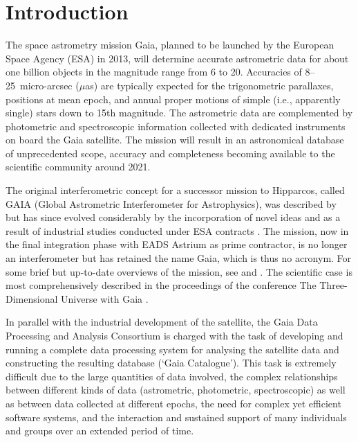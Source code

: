 \documentclass[structabstract]{aa}
\begin{document}
\section{Introduction}\label{sec:intro}

The space astrometry mission Gaia, planned to be launched by the
European Space Agency (ESA) in 2013, will determine accurate astrometric
data for about one billion objects in the magnitude range from 6 to 20.
Accuracies of 8--25~micro-arcsec ($\mu$as) are typically expected for the trigonometric
parallaxes, positions at mean epoch, and annual proper motions of
simple (i.e., apparently single) stars down to 15th magnitude. The
astrometric data are complemented by photometric and spectroscopic
information collected with dedicated instruments on board the Gaia
satellite. The mission will result in an astronomical database of
unprecedented scope, accuracy and completeness becoming available
to the scientific community around 2021.

The original interferometric concept for a successor mission to
Hipparcos, called GAIA (Global Astrometric Interferometer for
Astrophysics), was described by \citet{gaia1996} but has since evolved
considerably by the incorporation of novel ideas \citep{iaus248:EH} and as a 
result of industrial studies conducted under ESA contracts \citep{gaia2001}.
The mission, now in the final integration phase with
EADS Astrium as prime contractor, is no longer an interferometer but
has retained the name Gaia, which is thus no acronym. For some brief
but up-to-date overviews of the mission, see \citet{iaus248:LL}
and \citet{iaus261:LL}. The scientific case is most comprehensively described 
in the proceedings of the conference The Three-Dimensional Universe with 
Gaia \citep{2005ESASP.576.....T}.

In parallel with the industrial development of
the satellite, the Gaia Data Processing and Analysis Consortium
\citep[DPAC;][]{iaus248:FM} is charged with the task of developing and
running a complete data processing system for analysing the satellite
data and constructing the resulting database (`Gaia Catalogue').
This task is extremely difficult due to the large quantities of
data involved, the complex relationships between different kinds
of data (astrometric, photometric, spectroscopic) as well as between
data collected at different epochs, the need for complex yet efficient
software systems, and the interaction and sustained support of many
individuals and groups over an extended period of time.
\end{document}
